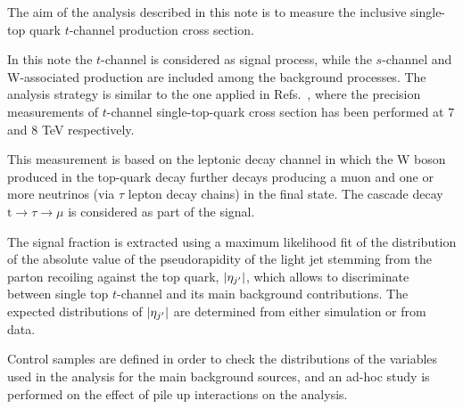 The aim of the analysis described in this note is to measure the inclusive single-top quark $t$-channel production cross section.

In this note the $t$-channel is considered as signal process, while the $s$-channel and W-associated production are included among the background processes. 
The analysis strategy is similar to the one applied in Refs.~\cite{TOP-11-021,TOP-12-038}, where the precision measurements of $t$-channel single-top-quark cross section has been performed at 7 and 8 TeV respectively.

This measurement is based on the leptonic decay channel in which the W boson produced in the top-quark decay further decays producing a muon and one or more neutrinos (via $\tau$ lepton decay chains) in the final state.
The cascade decay $\mathrm{t}\to\tau\to\mu$ is considered as part of the signal.

The signal fraction is extracted using a maximum likelihood fit of the distribution of the absolute value 
of the pseudorapidity of the light jet stemming from the parton recoiling against the top quark, $|\eta_{j^\prime}|$, 
which allows to discriminate between single top $t$-channel and its main background contributions.
The expected distributions of $|\eta_{j^\prime}|$ are determined from either simulation or from data.

Control samples are defined in order to check the distributions of the variables used in the analysis for the main background sources, 
and an ad-hoc study is performed on the effect of pile up interactions on the analysis.

